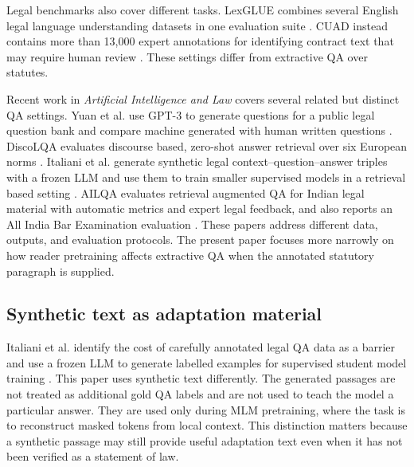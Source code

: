 \documentclass[pdflatex,sn-basic]{sn-jnl}
\begin{document}
Legal benchmarks also cover different tasks. LexGLUE combines several English
legal language understanding datasets in one evaluation suite
\citep{chalkidisLexGLUEBenchmarkDataset2022}. CUAD instead contains more than
13,000 expert annotations for identifying contract text that may require human
review \citep{hendrycksCUADExpertAnnotatedNLP2021}. These settings differ from
extractive QA over statutes.

Recent work in \emph{Artificial Intelligence and Law} covers several related but
distinct QA settings. Yuan et al. use GPT-3 to generate questions for a public
legal question bank and compare machine generated with human written questions
\citep{yuan2024bringing}. DiscoLQA evaluates discourse based, zero-shot answer
retrieval over six European norms \citep{sovrano2025discolqa}. Italiani et al.
generate synthetic legal context--question--answer triples with a frozen LLM
and use them to train smaller supervised models in a retrieval based setting
\citep{italiani2025enhancing}. AILQA evaluates retrieval augmented QA for Indian
legal material with automatic metrics and expert legal feedback, and also
reports an All India Bar Examination evaluation \citep{nigam2026ailqa}. These
papers address different data, outputs, and evaluation protocols. The present
paper focuses more narrowly on how reader pretraining affects extractive QA
when the annotated statutory paragraph is supplied.

\subsection{Synthetic text as adaptation material}

Italiani et al. identify the cost of carefully annotated legal QA data as a
barrier and use a frozen LLM to generate labelled examples for supervised
student model training \citep{italiani2025enhancing}. This paper uses synthetic
text differently. The generated passages are not treated as additional gold QA
labels and are not used to teach the model a particular answer. They are used
only during MLM pretraining, where the task is to reconstruct masked tokens from
local context. This distinction matters because a synthetic passage may still
provide useful adaptation text even when it has not been verified as a statement
of law.
\end{document}
